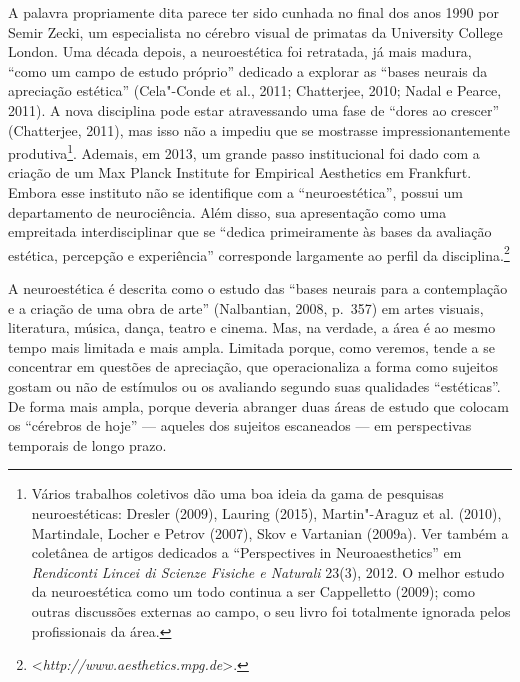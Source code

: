 A palavra propriamente dita parece ter sido cunhada no final dos anos
1990 por Semir Zecki, um especialista no cérebro visual de primatas da
University College London. Uma década depois, a neuroestética foi
retratada, já mais madura, ``como um campo de estudo próprio'' dedicado
a explorar as ``bases neurais da apreciação estética'' (Cela"-Conde et
al., 2011; Chatterjee, 2010; Nadal e Pearce, 2011). A nova disciplina
pode estar atravessando uma fase de ``dores ao crescer'' (Chatterjee,
2011), mas isso não a impediu que se mostrasse impressionantemente
produtiva\footnote[14]{Vários trabalhos coletivos dão uma boa ideia da gama de pesquisas
neuroestéticas: Dresler (2009), Lauring (2015), Martin"-Araguz et al.
(2010), Martindale, Locher e Petrov (2007), Skov e Vartanian (2009a).
Ver também a coletânea de artigos dedicados a ``Perspectives in
Neuroaesthetics'' em \emph{Rendiconti Lincei di Scienze Fisiche e
Naturali} 23(3), 2012. O melhor estudo da neuroestética como um todo
continua a ser Cappelletto (2009); como outras discussões externas ao
campo, o seu livro foi totalmente ignorada pelos profissionais da área.}. Ademais, em 2013, um grande passo
institucional foi dado com a criação de um Max Planck Institute for
Empirical Aesthetics em Frankfurt. Embora esse instituto não se
identifique com a ``neuroestética'', possui um departamento de
neurociência. Além disso, sua apresentação como uma empreitada
interdisciplinar que se ``dedica primeiramente às bases da avaliação
estética, percepção e experiência'' corresponde largamente ao perfil da
disciplina.\footnote[15]{\textless{}\emph{http://www.aesthetics.mpg.de}\textgreater{}.}

A neuroestética é descrita como o estudo das ``bases neurais para a
contemplação e a criação de uma obra de arte'' (Nalbantian, 2008, p.~357)
em artes visuais, literatura, música, dança, teatro e cinema. Mas, na
verdade, a área é ao mesmo tempo mais limitada e mais ampla. Limitada
porque, como veremos, tende a se concentrar em questões de apreciação,
que operacionaliza a forma como sujeitos gostam ou não de estímulos ou
os avaliando segundo suas qualidades ``estéticas''. De forma mais ampla,
porque deveria abranger duas áreas de estudo que colocam os ``cérebros
de hoje'' --- aqueles dos sujeitos escaneados --- em perspectivas
temporais de longo prazo.


